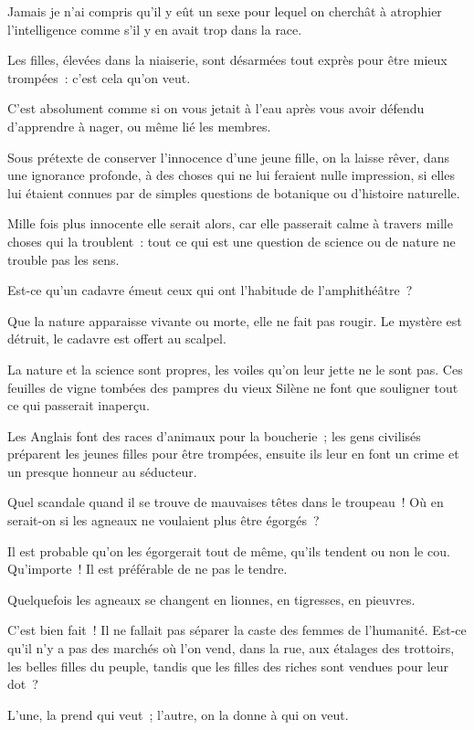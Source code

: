 \documentclass[french,twoside]{book} %
\begin{document}
Jamais je n’ai compris qu’il y eût un sexe pour lequel on cherchât à atrophier l’intelligence comme s’il y en avait trop dans la race.\par
Les filles, élevées dans la niaiserie, sont désarmées tout exprès pour être mieux trompées : c’est cela qu’on veut.\par
C’est absolument comme si on vous jetait à l’eau après vous avoir défendu d’apprendre à nager, ou même lié les membres.\par
Sous prétexte de conserver l’innocence d’une  jeune fille, on la laisse rêver, dans une ignorance profonde, à des choses qui ne lui feraient nulle impression, si elles lui étaient connues par de simples questions de botanique ou d’histoire naturelle.\par
Mille fois plus innocente elle serait alors, car elle passerait calme à travers mille choses qui la troublent : tout ce qui est une question de science ou de nature ne trouble pas les sens.\par
Est-ce qu’un cadavre émeut ceux qui ont l’habitude de l’amphithéâtre ?\par
Que la nature apparaisse vivante ou morte, elle ne fait pas rougir. Le mystère est détruit, le cadavre est offert au scalpel.\par
La nature et la science sont propres, les voiles qu’on leur jette ne le sont pas. Ces feuilles de vigne tombées des pampres du vieux Silène ne font que souligner tout ce qui passerait inaperçu.\par
Les Anglais font des races d’animaux pour la boucherie ; les gens civilisés préparent les jeunes filles pour être trompées, ensuite ils leur en font un crime et un presque honneur au séducteur.\par
Quel scandale quand il se trouve de mauvaises têtes dans le troupeau ! Où en serait-on si les agneaux ne voulaient plus être égorgés ?\par
Il est probable qu’on les égorgerait tout de  même, qu’ils tendent ou non le cou. Qu’importe ! Il est préférable de ne pas le tendre.\par
Quelquefois les agneaux se changent en lionnes, en tigresses, en pieuvres.\par
C’est bien fait ! Il ne fallait pas séparer la caste des femmes de l’humanité. Est-ce qu’il n’y a pas des marchés où l’on vend, dans la rue, aux étalages des trottoirs, les belles filles du peuple, tandis que les filles des riches sont vendues pour leur dot ?\par
L’une, la prend qui veut ; l’autre, on la donne à qui on veut.\par
\end{document}
